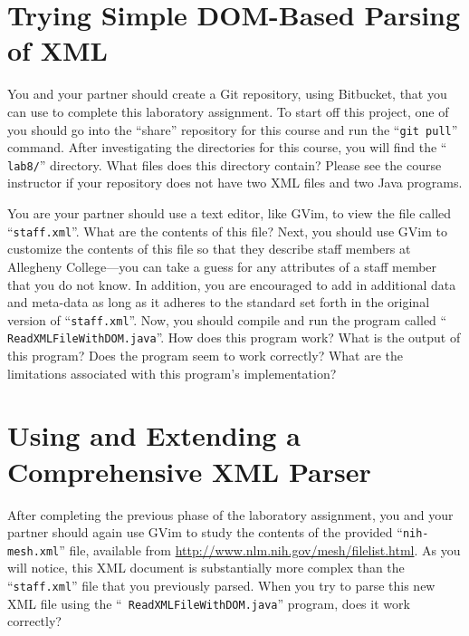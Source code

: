 \section*{Trying Simple DOM-Based Parsing of XML}

You and your partner should create a Git repository, using Bitbucket, that you can use to complete this laboratory
assignment.  To start off this project, one of you should go into the ``share'' repository for this course and run the
``{\tt git pull}'' command. After investigating the directories for this course, you will find the ``{\tt
  lab8/}'' directory. What files does this directory contain?  Please see the course instructor if your repository does
not have two XML files and two Java programs.

You are your partner should use a text editor, like GVim, to view the file called ``{\tt staff.xml}''.  What are the
contents of this file?  Next, you should use GVim to customize the contents of this file so that they describe staff
members at Allegheny College---you can take a guess for any attributes of a staff member that you do not know.  In
addition, you are encouraged to add in additional data and meta-data as long as it adheres to the standard set forth in
the original version of ``{\tt staff.xml}''. Now, you should compile and run the program called ``{\tt
  ReadXMLFileWithDOM.java}''. How does this program work? What is the output of this program? Does the program seem to
work correctly? What are the limitations associated with this program's implementation? 

\vspace*{-.05in}
\section*{Using and Extending a Comprehensive XML Parser}

After completing the previous phase of the laboratory assignment, you and your partner should again use GVim to study
the contents of the provided ``{\tt nih-mesh.xml}'' file, available from
\url{http://www.nlm.nih.gov/mesh/filelist.html}. As you will notice, this XML document is substantially more complex
than the ``{\tt staff.xml}'' file that you previously parsed.  When you try to parse this new XML file using the ``{\tt
  ReadXMLFileWithDOM.java}'' program, does it work correctly?


